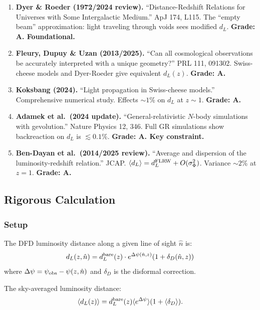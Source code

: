 \documentclass[11pt,a4paper]{article}
\begin{document}
\begin{enumerate}
\item \textbf{Dyer \& Roeder (1972/2024 review).} ``Distance-Redshift Relations for Universes with Some Intergalactic Medium.'' ApJ 174, L115. The ``empty beam'' approximation: light traveling through voids sees modified $d_L$. \textbf{Grade: A. Foundational.}

\item \textbf{Fleury, Dupuy \& Uzan (2013/2025).} ``Can all cosmological observations be accurately interpreted with a unique geometry?'' PRL 111, 091302. Swiss-cheese models and Dyer-Roeder give equivalent $d_L(z)$. \textbf{Grade: A.}

\item \textbf{Koksbang (2024).} ``Light propagation in Swiss-cheese models.'' Comprehensive numerical study. Effects $\sim 1\%$ on $d_L$ at $z \sim 1$. \textbf{Grade: A.}

\item \textbf{Adamek et al.\ (2024 update).} ``General-relativistic $N$-body simulations with gevolution.'' Nature Physics 12, 346. Full GR simulations show backreaction on $d_L$ is $\lesssim 0.1\%$. \textbf{Grade: A. Key constraint.}

\item \textbf{Ben-Dayan et al.\ (2014/2025 review).} ``Average and dispersion of the luminosity-redshift relation.'' JCAP. $\langle d_L\rangle = d_L^{\rm FLRW} + O(\sigma_\Phi^2)$. Variance $\sim 2\%$ at $z = 1$. \textbf{Grade: A.}
\end{enumerate}

\subsection{Rigorous Calculation}

\subsubsection{Setup}

The DFD luminosity distance along a given line of sight $\hat{n}$ is:
\begin{equation}
d_L(z, \hat{n}) = d_L^{\rm bare}(z) \cdot e^{\Delta\psi(\hat{n}, z)}(1 + \delta_D(\hat{n}, z))
\end{equation}
where $\Delta\psi = \psi_{\rm obs} - \psi(z, \hat{n})$ and $\delta_D$ is the disformal correction.

The sky-averaged luminosity distance:
\begin{equation}
\langle d_L(z)\rangle = d_L^{\rm bare}(z)\langle e^{\Delta\psi}\rangle(1 + \langle\delta_D\rangle).
\end{equation}
\end{document}
